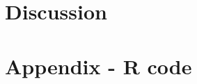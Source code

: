 \documentclass[11pt]{article}
\begin{document}
	\section{Discussion}\label{discussion}
	
	
	
	\begin{thebibliography}{9}
		
	\end{thebibliography}
	
	\section*{Appendix - R code}\label{appendix}
	
	
\end{document}
